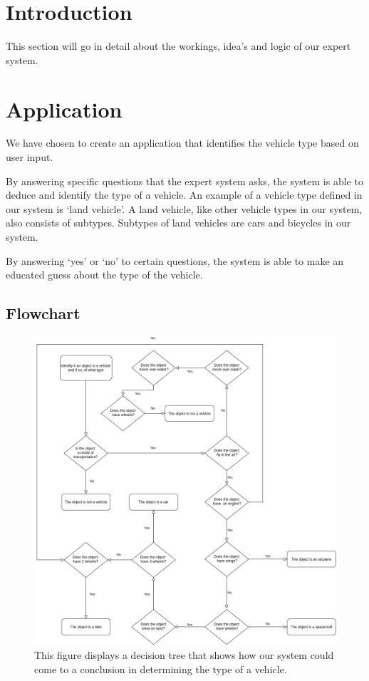 \section{Introduction} \label{man-introduction}
This section will go in detail about the workings, idea's and logic of our expert system.

\section{Application} \label{man-application}
We have chosen to create an application that identifies the vehicle type based on user input.

By answering specific questions that the expert system asks,
the system is able to deduce and identify the type of a vehicle.
An example of a vehicle type defined in our system is `land vehicle'.
A land vehicle, like other vehicle types in our system, also consists
of subtypes. Subtypes of land vehicles are cars and bicycles in our system.

By answering `yes' or `no' to certain questions,
the system is able to make an educated
guess about the type of the vehicle.

\subsection{Flowchart} \label{man-diagram-application}
\begin{figure}[H]
  \includegraphics[width=\linewidth]{images/flowchart-prolog-vehicle-expert-system.png}
  \caption{This figure displays a decision tree that shows how our system could
  come to a conclusion in determining the type of a vehicle.}
  \label{fig:flowchart-expert-system}
\end{figure}


